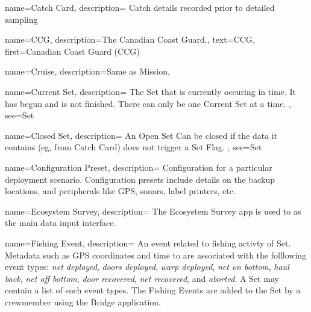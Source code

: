  {
  name=Catch Card,
  description={
    Catch details recorded prior to detailed sampling
  }
}

 {
  name=CCG,
  description={The Canadian Coast Guard.},
  text={CCG},
  first={Canadian Coast Guard (CCG)}
}

 {
  name=Cruise,
  description={Same as \gls{Mission}},
}

 {
  name=Current Set,
  description={
    The \gls{Set} that is currently occuring in time.
    It has begun and is not finished.
    There can only be one \gls{Current Set} at a time.
  },
  see={Set}
}

 {
  name=Closed Set,
  description={
    An \gls{Open Set} Can be closed if the data it contains (eg, from \gls{Catch Card}) does not trigger a \gls{Set Flag}.
  },
  see={Set}
}

  {
  name=Configuration Preset,
  description={
    Configuration for a particular deployment scenario. Configuration presets include details on the backup locations, and peripherals like GPS, sonars, label printers, etc.
  }
}






 {
  name=Ecosystem Survey,
  description={
    The Ecosystem Survey app is used to as the main data input interface.
    }
}




 {
  name=Fishing Event,
  description={
    An event related to fishing activty of \gls{Set}.
    Metadata such as GPS coordinates and time to are associated with the folllowing event types:
    \emph{net deployed},
    \emph{doors deployed},
    \emph{warp deployed},
    \emph{net on bottom},
    \emph{haul back},
    \emph{net off bottom},
    \emph{door recovered},
    \emph{net recovered},
    and \emph{aborted}.
    A \gls{Set} may contain a list of such event types.
    The Fishing Events are added to the \gls{Set} by a crewmember using the \gls{Bridge} application.
  }
}

